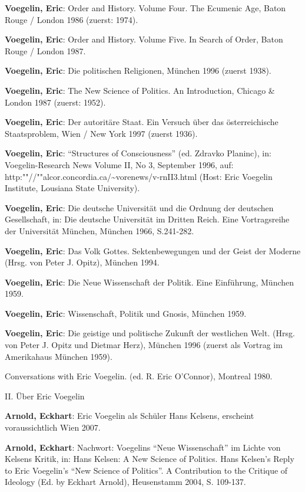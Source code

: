 {\bf Voegelin, Eric}: Order and History. Volume Four. The Ecumenic Age, Baton
Rouge / London 1986 (zuerst: 1974).

{\bf Voegelin, Eric}: Order and History. Volume Five. In Search of Order,
Baton Rouge / London 1987.

{\bf Voegelin, Eric}: Die politischen Religionen, München 1996 (zuerst 1938).

{\bf Voegelin, Eric}: The New Science of Politics. An Introduction, Chicago \&
London 1987 (zuerst: 1952).

{\bf Voegelin, Eric}: Der autoritäre Staat. Ein Versuch über das
österreichische Staatsproblem, Wien / New York 1997 (zuerst 1936).

{\bf Voegelin, Eric}: "`Structures of Consciousness"' (ed. Zdravko Planinc),
in: Voegelin-Research News Volume II, No 3, September 1996, auf:
http:""//""alcor.concordia.ca/\~{ }vorenews/v-rnII3.html (Host: Eric Voegelin
Institute, Lousiana State University).

{\bf Voegelin, Eric}: Die deutsche Universität und die Ordnung der deutschen
Gesellschaft, in: Die deutsche Universität im Dritten Reich. Eine
Vortragsreihe der Universität München, München 1966, S.241-282.

{\bf Voegelin, Eric}: Das Volk Gottes. Sektenbewegungen und der Geist der
Moderne (Hrsg. von Peter J. Opitz), München 1994.

{\bf Voegelin, Eric}: Die Neue Wissenschaft der Politik. Eine Einführung,
München 1959.  %

{\bf Voegelin, Eric}: Wissenschaft, Politik und Gnosis, München 1959.

{\bf Voegelin, Eric}: Die geistige und politische Zukunft der westlichen
Welt. (Hrsg. von Peter J. Opitz und Dietmar Herz), München 1996 
(zuerst als Vortrag im Amerikahaus München 1959).

Conversations with Eric Voegelin. (ed. R. Eric O'Connor), Montreal 1980.


\setlength{\parskip}{5ex}

{\large II. Über Eric Voegelin}

\setlength{\parskip}{3ex}

{\bf Arnold, Eckhart}: Eric Voegelin als Schüler Hans Kelsens, erscheint
voraussichtlich Wien 2007.

\setlength{\parskip}{1.5ex}

{\bf Arnold, Eckhart}: Nachwort: Voegelins "`Neue Wissenschaft"' im Lichte von
Kelsens Kritik, in: Hans Kelsen: A New Science of Politics. Hans Kelsen's
Reply to Eric Voegelin's "`New Science of Politics"'. A Contribution to the
Critique of Ideology (Ed. by Eckhart Arnold), Heusenstamm 2004, S. 109-137.

